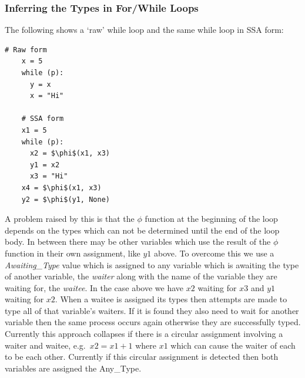 \documentclass[12pt, titlepage]{article}
\begin{document}
\subsubsection{Inferring the Types in For/While Loops}
The following shows a `raw' while loop and the same while loop in SSA form:
\begin{lstlisting}[mathescape]
    # Raw form
    x = 5
    while (p):
      y = x
      x = "Hi"
	
    # SSA form
    x1 = 5
    while (p):
      x2 = $\phi$(x1, x3)
      y1 = x2
      x3 = "Hi"
    x4 = $\phi$(x1, x3)
    y2 = $\phi$(y1, None)
\end{lstlisting}
A problem raised by this is that the $\phi$ function at the beginning of the loop depends on the types which can not be determined until the end of the loop body. In between there may be other variables which use the result of the $\phi$ function in their own assignment, like $y1$ above. To overcome this we use a \textit{Awaiting\_Type} value which is assigned to any variable which is awaiting the type of another variable, the \textit{waiter} along with the name of the variable they are waiting for, the \textit{waitee}. In the case above we have $x2$ waiting for $x3$ and $y1$ waiting for $x2$. When a waitee is assigned its types then attempts are made to type all of that variable's waiters. If it is found they also need to wait for another variable then the same process occurs again otherwise they are successfully typed. Currently this approach collapses if there is a circular assignment involving a waiter and waitee, e.g.\ $x2 = x1 + 1$ where $x1$ which can cause the waiter of each to be each other. Currently if this circular assignment is detected then both variables are assigned the Any\_Type.
\end{document}
